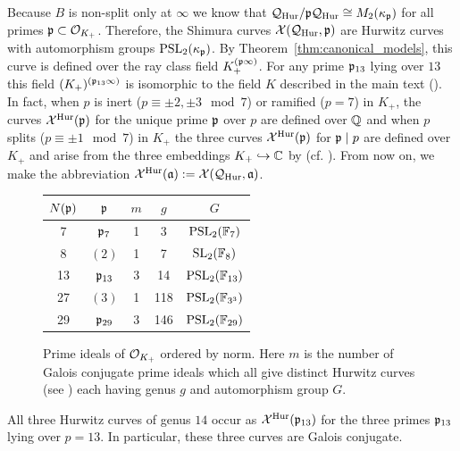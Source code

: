 \documentclass[main.tex]{subfiles}
\begin{document}
Because $B$ is non-split only at $\infty$ we know that $\mathcal{Q}_{\mathrm{Hur}} / \mathfrak{p}\mathcal{Q}_{\mathrm{Hur}} \cong M_2(\kappa_{\mathfrak{p}})$ for all primes $\mathfrak{p} \subset \mathcal{O}_{K_+}$. Therefore, 
the Shimura curves $\mathcal{X}(\mathcal{Q}_{\mathrm{Hur}}, \mathfrak{p})$ are Hurwitz curves with automorphism groups $\mathrm{PSL}_2(\kappa_{\mathfrak{p}})$. By Theorem~\ref{thm:canonical_models}, this curve is defined over the ray class field $K_+^{(\mathfrak{p} \infty)}$. For any prime $\mathfrak{p}_{13}$ lying over $13$ this field $(K_+)^{(\mathfrak{p}_{13} \infty)}$ is isomorphic to the field $K$ described in the main text (\cite{lmfdb:nf-6.2.31213.1}). In fact, when $p$ is inert ($p \equiv \pm 2, \pm 3 \mod 7$) or ramified ($p = 7$) in $K_+$, the curves $\mathcal{X}^{\mathrm{Hur}}(\mathfrak{p})$ for the unique prime $\mathfrak{p}$ over $p$ are defined over $\mathbb{Q}$ and when $p$ splits ($p \equiv \pm 1 \mod 7$) in $K_+$ the three curves $\mathcal{X}^{\mathrm{Hur}}(\mathfrak{p})$ for $\mathfrak{p} \mid p$ are defined over $K_+$ and arise from the three embeddings $K_+ \hookrightarrow \mathbb{C}$ by \cite[Theorem~B]{voight:triangle_groups}
(cf. \cite[Proposition~5.1.2]{voight:thesis}). From now on, we make the abbreviation $\mathcal{X}^{\mathrm{Hur}}(\mathfrak{a}) := \mathcal{X}(\mathcal{Q}_{\mathrm{Hur}}, \mathfrak{a})$.

\begin{figure}
\begin{center}
    \begin{tabular}{c|c|c|c|c}
        $N(\mathfrak{p})$ & $\mathfrak{p}$ & $m$ & $g$ & $G$
         \\
         \hline
         7 & $\mathfrak{p}_7$ & 1 & 3 & $\mathrm{PSL}_2(\mathbb{F}_7)$
         \\
         8 & $(2)$ & 1 & 7 & $\mathrm{SL}_2(\mathbb{F}_8)$
         \\
         13 & $\mathfrak{p}_{13}$ & 3 & 14 & $\mathrm{PSL}_2(\mathbb{F}_{13})$
         \\
         27 & $(3)$ & 1 & 118 & $\mathrm{PSL}_2(\mathbb{F}_{3^3})$
         \\
         29 & $\mathfrak{p}_{29}$ & 3 & 146 & $\mathrm{PSL}_2(\mathbb{F}_{29})$
    \end{tabular}
\end{center}
\caption{Prime ideals of $\mathcal{O}_{K_+}$ ordered by norm. Here $m$ is the number of Galois conjugate prime ideals which all give distinct Hurwitz curves (see \cite[3.19.2]{shimura:curves}) each having genus $g$ and automorphism group $G$.}
\end{figure}

\begin{theorem}
All three Hurwitz curves of genus $14$ occur as $\mathcal{X}^{\mathrm{Hur}}(\mathfrak{p}_{13})$ for the three primes $\mathfrak{p}_{13}$ lying over $p = 13$. In particular, these three curves are Galois conjugate.
\end{theorem}
\end{document}
